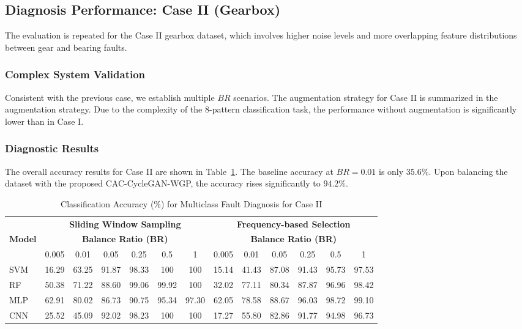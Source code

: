 \subsection{Diagnosis Performance: Case II (Gearbox)}
The evaluation is repeated for the Case II gearbox dataset, which involves higher noise levels and more overlapping feature distributions between gear and bearing faults.

\subsubsection{Complex System Validation}
Consistent with the previous case, we establish multiple $BR$ scenarios. The augmentation strategy for Case II is summarized in the augmentation strategy. Due to the complexity of the 8-pattern classification task, the performance without augmentation is significantly lower than in Case I.

\subsubsection{Diagnostic Results}
The overall accuracy results for Case II are shown in Table~\ref{tab:acc_case2}. The baseline accuracy at $BR=0.01$ is only $35.6\%$. Upon balancing the dataset with the proposed CAC-CycleGAN-WGP, the accuracy rises significantly to $94.2\%$. 

\begin{table}[!t]
\centering
\caption{Classification Accuracy (\%) for Multiclass Fault Diagnosis for Case II}
\label{tab:acc_case2}
\begin{tabular}{lcccccccccccc}
\hline
 & \multicolumn{6}{c}{\textbf{Sliding Window Sampling}} & \multicolumn{6}{c}{\textbf{Frequency-based Selection}} \\
\textbf{Model} & \multicolumn{6}{c}{\textbf{Balance Ratio (BR)}} & \multicolumn{6}{c}{\textbf{Balance Ratio (BR)}} \\
 & 0.005 & 0.01 & 0.05 & 0.25 & 0.5 & 1 & 0.005 & 0.01 & 0.05 & 0.25 & 0.5 & 1 \\ \hline
SVM & 16.29 & 63.25 & 91.87 & 98.33 & 100 & 100 & 15.14 & 41.43 & 87.08 & 91.43 & 95.73 & 97.53 \\
RF & 50.38 & 71.22 & 88.60 & 99.06 & 99.92 & 100 & 32.02 & 77.11 & 80.34 & 87.87 & 96.96 & 98.42 \\
MLP & 62.91 & 80.02 & 86.73 & 90.75 & 95.34 & 97.30 & 62.05 & 78.58 & 88.67 & 96.03 & 98.72 & 99.10 \\
CNN & 25.52 & 45.09 & 92.02 & 98.23 & 100 & 100 & 17.27 & 55.80 & 82.86 & 91.77 & 94.98 & 96.73 \\
\hline
\end{tabular}
\end{table}

